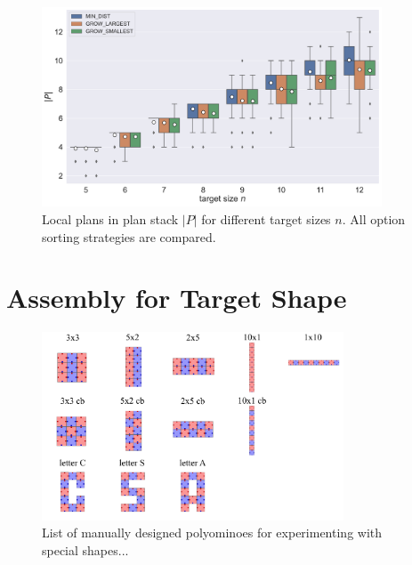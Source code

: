 \begin{figure}
	\centering
	\includegraphics[width=0.9\textwidth]{figures/plots/AFN_ltg.pdf}
	\caption[Local plans in plan stack for different target sizes]{Local plans in plan stack $|P|$ for different target sizes $n$. All option sorting strategies are compared.}
	\label{fig:AFN_ltg}
\end{figure}



\section{Assembly for Target Shape}
\label{sec:AFTS}

\begin{figure}
	\centering
	\includegraphics[width=0.8\textwidth]{figures/AFTS_shapes.pdf}
	\caption[List of manually designed polyominoes]{List of manually designed polyominoes for experimenting with special shapes...}
	\label{fig:AFTS_shapes}
\end{figure}


